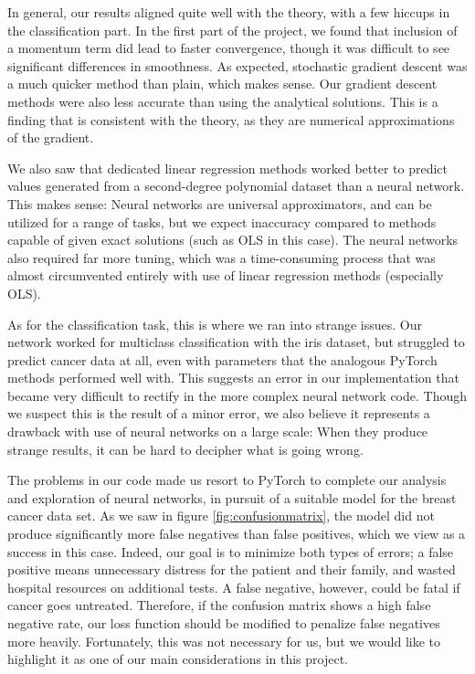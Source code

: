 In general, our results aligned quite well with the theory, with a few hiccups in the classification part. In the first part of the project, we found that inclusion of a momentum term did lead to faster convergence, though it was difficult to see significant differences in smoothness. As expected, stochastic gradient descent was a much quicker method than plain, which makes sense. Our gradient descent methods were also less accurate than using the analytical solutions. This is a finding that is consistent with the theory, as they are numerical approximations of the gradient. 

We also saw that dedicated linear regression methods worked better to predict values generated from a second-degree polynomial dataset than a neural network. This makes sense: Neural networks are universal approximators, and can be utilized for a range of tasks, but we expect inaccuracy compared to methods capable of given exact solutions (such as OLS in this case). The neural networks also required far more tuning, which was a time-consuming process that was almost circumvented entirely with use of linear regression methods (especially OLS).

As for the classification task, this is where we ran into strange issues. Our network worked for multiclass classification with the iris dataset, but struggled to predict cancer data at all, even with parameters that the analogous PyTorch methods performed well with. This suggests an error in our implementation that became very difficult to rectify in the more complex neural network code. Though we suspect this is the result of a minor error, we also believe it represents a drawback with use of neural networks on a large scale: When they produce strange results, it can be hard to decipher what is going wrong. 

The problems in our code made us resort to PyTorch to complete our analysis and exploration of neural networks, in pursuit of a suitable model for the breast cancer data set. As we saw in figure \ref{fig:confusionmatrix}, the model did not produce significantly more false negatives than false positives, which we view as a success in this case. Indeed, our goal is to minimize both types of errors; a false positive means unnecessary distress for the patient and their family, and wasted hospital resources on additional tests. A false negative, however, could be fatal if cancer goes untreated. Therefore, if the confusion matrix shows a high false negative rate, our loss function should be modified to penalize false negatives more heavily. Fortunately, this was not necessary for us, but we would like to highlight it as one of our main considerations in this project. 

